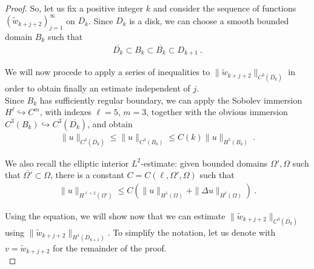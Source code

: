 \documentclass[a4paper,11pt,openright,twoside]{book}
\renewcommand{\Omega}{\varOmega}
\newcommand{\1}{\mathds{1}}
\theoremstyle{plain}
\theoremstyle{definition}
\theoremstyle{remark}
\begin{document}
\begin{proof}
	So, let us fix a positive integer $k$ and consider the sequence of functions $(\tilde w_{k+j+2})_{j=1}^\infty$ on $D_k$. Since $D_k$ is a disk, we can choose a smooth bounded domain $B_k$ such that
	\begin{align*}
		\overline{D_k} \subset  B_k \subset \overline{B_k}\subset D_{k+1}
	\ . 
	\end{align*}
	
	We will now procede to apply a series of inequalities to $\| \tilde w_{k+j+2}\|_{C^3(\overline{D_k})}$ in order to obtain finally an estimate independent of $j$.\\

	Since $B_k$ has sufficiently regular boundary, we can apply the Sobolev immersion $H^{\ell} \hookrightarrow C^m$, with indexes $\ell = 5$, $m=3$, together with the obvious immersion $C^3(B_k)\hookrightarrow C^3(\overline{D_k})$, and obtain
	\begin{align}\label{eq:exthm1}
		\| u  \|_{C^3(\overline{D_{k}})} \leq \|u\|_{C^3(B_k)}
		\leq C(k)\|u\|_{H^5(B_k)}
	\ . 
	\end{align}
	
	We also recall the elliptic interior $L^2$-estimate: given bounded domains $\Omega',\Omega$ such that $\overline{\Omega'} \subset  \Omega$, there is a constant $C = C(\ell,\Omega',\Omega)$ such that
	\begin{align*}
		\|u\|_{H^{\ell+2}(\Omega')} \leq C \left( \|u\|_{H^1(\Omega)}+\|\Delta u\|_{H^\ell(\Omega)} \right)
	\ . 
	\end{align*}
	
	Using the equation, we will show now that we can estimate $\|\tilde w_{k+j+2}\|_{C^3(\overline{D_k})}$ using $\|\tilde w_{k+j+2}\|_{H^1(D_{k+1})}$. To simplify the notation, let us denote with $v=\tilde w_{k+j+2}$ for the remainder of the proof.\\


\end{proof}
\end{document}
